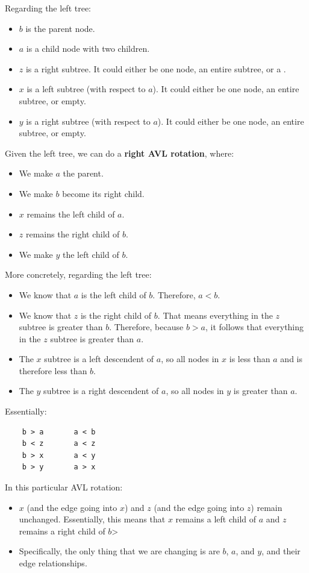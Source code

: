 \documentclass[letterpaper]{article}
\begin{document}
\bigskip 

Regarding the left tree: 
\begin{itemize}
    \item $b$ is the parent node. 
    \item $a$ is a child node with two children. 
    \item $z$ is a right subtree. It could either be one node, an entire subtree, or a . 
    \item $x$ is a left subtree (with respect to $a$). It could either be one node, an entire subtree, or empty. 
    \item $y$ is a right subtree (with respect to $a$). It could either be one node, an entire subtree, or empty. 
\end{itemize}
Given the left tree, we can do a \textbf{right AVL rotation}, where: 
\begin{itemize}
    \item We make $a$ the parent. 
    \item We make $b$ become its right child. 
    \item $x$ remains the left child of $a$. 
    \item $z$ remains the right child of $b$. 
    \item We make $y$ the left child of $b$. 
\end{itemize}
More concretely, regarding the left tree: 
\begin{itemize}
    \item We know that $a$ is the left child of $b$. Therefore, $a < b$. 
    \item We know that $z$ is the right child of $b$. That means everything in the $z$ subtree is greater than $b$. Therefore, because $b > a$, it follows that everything in the $z$ subtree is greater than $a$. 
    \item The $x$ subtree is a left descendent of $a$, so all nodes in $x$ is less than $a$ and is therefore less than $b$. 
    \item The $y$ subtree is a right descendent of $a$, so all nodes in $y$ is greater than $a$. 
\end{itemize}
Essentially: 
\begin{verbatim}
    b > a       a < b 
    b < z       a < z
    b > x       a < y
    b > y       a > x
\end{verbatim}
In this particular AVL rotation: 
\begin{itemize}
    \item $x$ (and the edge going into $x$) and $z$ (and the edge going into $z$) remain unchanged. Essentially, this means that $x$ remains a left child of $a$ and $z$ remains a right child of $b$>
    \item Specifically, the only thing that we are changing is are $b$, $a$, and $y$, and their edge relationships. 
\end{itemize}
\end{document}
